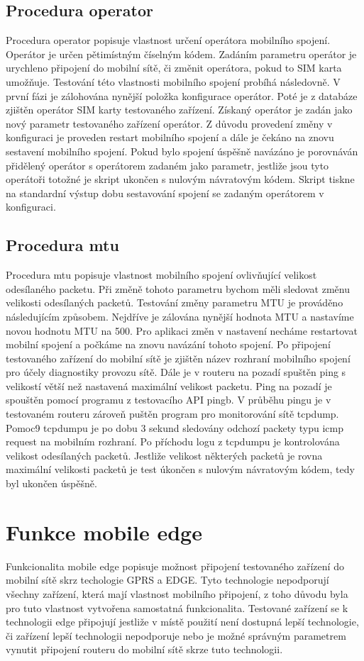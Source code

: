 \subsection{Procedura operator}
Procedura operator popisuje vlastnost určení operátora mobilního spojení. Operátor je určen pětimístným číselným kódem. Zadáním parametru operátor je urychleno připojení do mobilní sítě, či změnit operátora, pokud to SIM karta umožňuje. Testování této vlastnosti mobilního spojení probíhá následovně. V první fázi je zálohována nynější položka konfigurace operátor. Poté je z databáze zjištěn operátor SIM karty testovaného zařízení. Získaný operátor je zadán jako nový parametr testovaného zařízení operátor. Z důvodu provedení změny v konfiguraci je proveden restart mobilního spojení a dále je čekáno na znovu sestavení mobilního spojení. Pokud bylo spojení úspěšně navázáno je porovnáván přidělený operátor s operátorem zadaném jako parametr, jestliže jsou tyto operátoři totožné je skript ukončen s nulovým návratovým kódem. Skript tiskne na standardní výstup dobu sestavování spojení se zadaným operátorem v konfiguraci.

\subsection{Procedura mtu}
Procedura mtu popisuje vlastnost mobilního spojení ovlivňující velikost odesílaného packetu. Při změně tohoto parametru bychom měli sledovat změnu velikosti odesílaných packetů. Testování změny parametru MTU je prováděno následujícím způsobem. Nejdříve je zálována nynější hodnota MTU a nastavíme novou hodnotu MTU na 500. Pro aplikaci změn v nastavení necháme restartovat mobilní spojení a počkáme na znovu navázání tohoto spojení. Po připojení testovaného zařízení do mobilní sítě je zjištěn název rozhraní mobilního spojení pro účely diagnostiky provozu sítě. Dále je v routeru na pozadí spuštěn ping s velikostí větší než nastavená maximální velikost packetu. Ping na pozadí je spouštěn pomocí programu z testovacího API pingb. V průběhu pingu je v testovaném routeru zároveň puštěn program pro monitorování sítě tcpdump. Pomoc9 tcpdumpu je po dobu 3 sekund sledovány odchozí packety typu icmp request na mobilním rozhraní. Po příchodu logu z tcpdumpu je kontrolována velikost odesílaných packetů. Jestliže velikost některých packetů je rovna maximální velikosti packetů je test úkončen s nulovým návratovým kódem, tedy byl ukončen úspěšně.

\section{Funkce mobile edge}
Funkcionalita mobile edge popisuje možnost připojení testovaného zařízení do mobilní sítě skrz techologie GPRS a EDGE. Tyto technologie nepodporují všechny zařízení, která mají vlastnost mobilního připojení, z toho důvodu byla pro tuto vlastnost vytvořena samostatná funkcionalita. Testované zařízení se k technologii edge připojují jestliže v místě použití není dostupná lepší technologie, či zařízení lepší technologii nepodporuje nebo je možné správným parametrem vynutit připojení routeru do mobilní sítě skrze tuto technologii.

